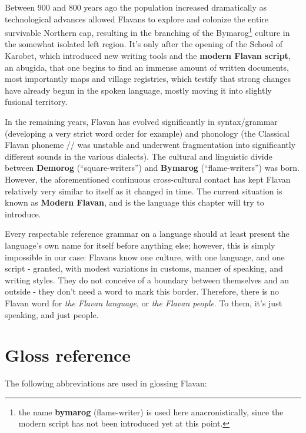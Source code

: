 \documentclass[10pt,oneside]{memoir}
\newcommand{\ipa}[1]{/\textipa{#1}/}
\newcommand{\grammar}[1]{\textsc{#1}}
\begin{document}
Between 900 and 800 years ago the population increased dramatically as technological advances allowed Flavans to explore and colonize the entire survivable Northern cap, resulting in the branching of the Bymarog\footnote{the name \textbf{bymarog} (flame-writer) is used here anacronistically, since the modern script has not been introduced yet at this point.} culture in the somewhat isolated left region. It's only after the opening of the School of Karobet, which introduced new writing tools and the \textbf{modern Flavan script}, an abugida, that one begins to find an immense amount of written documents, most importantly maps and village registries, which testify that strong changes have already begun in the spoken language, mostly moving it into slightly fusional territory.

In the remaining years, Flavan has evolved significantly in syntax/grammar (developing a very strict word order for example) and phonology (the Classical Flavan phoneme \ipa{1} was unstable and underwent fragmentation into significantly different sounds in the various dialects). The cultural and linguistic divide between \textbf{Demorog} (``square-writers'') and \textbf{Bymarog} (``flame-writers'') was born. However, the aforementioned continuous cross-cultural contact has kept Flavan relatively very similar to itself as it changed in time. The current situation is known as \textbf{Modern Flavan}, and is the language this chapter will try to introduce.

Every respectable reference grammar on a language should at least present the language's own name for itself before anything else; however, this is simply impossible in our case: Flavans know one culture, with one language, and one script - granted, with modest variations in customs, manner of speaking, and writing styles. They do not conceive of a boundary between themselves and an outside - they don't need a word to mark this border. Therefore, there is no Flavan word for \emph{the Flavan language}, or \emph{the Flavan people}. To them, it's just speaking, and just people.

\pagebreak


\section{Gloss reference}

The following abbreviations are used in glossing Flavan:

\newcommand{\ONES}{\grammar{1s}}
\newcommand{\ONEPINC}{\grammar{1inc}}
\newcommand{\ONEPEXC}{\grammar{1exc}}
\newcommand{\TWO}{\grammar{2}}
\newcommand{\THR}{\grammar{3s}}
\newcommand{\THP}{\grammar{3p}}
\end{document}
